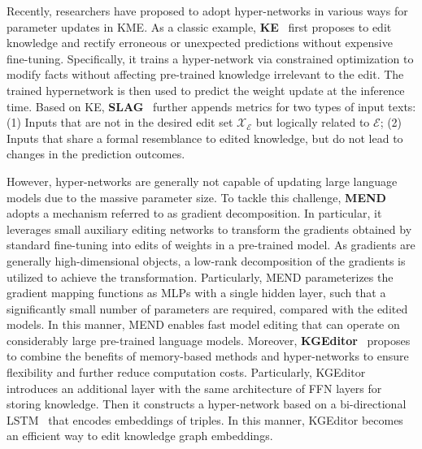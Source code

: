 \documentclass[acmsmall, screen]{acmart}
\begin{document}
Recently, researchers have proposed to adopt hyper-networks in various ways for parameter updates in KME. As a classic example, \textbf{KE}~\cite{cao2021editing} first proposes to edit knowledge and rectify erroneous or unexpected predictions without expensive fine-tuning. Specifically, it trains a hyper-network via constrained optimization to modify facts without affecting pre-trained knowledge irrelevant to the edit. The trained hypernetwork is then used to predict the weight update at the inference time. Based on KE, \textbf{SLAG}~\cite{hase2023methods} further appends metrics for two types of input texts: ({1)} Inputs that are not in the desired edit set $\mathcal{X}_\mathcal{E}$ but logically related to $\mathcal{E}$; (2) Inputs that share a formal resemblance to edited knowledge, but do not lead to changes in the prediction outcomes. 

However, hyper-networks are generally not capable of updating large language models due to the massive parameter size. To tackle this challenge, \textbf{MEND}~\cite{mitchell2022fast} adopts a mechanism referred to as gradient decomposition. In particular, it leverages small auxiliary editing networks to transform the gradients obtained by standard fine-tuning into edits of weights in a pre-trained model. As gradients are generally high-dimensional objects, a low-rank decomposition of the gradients is utilized to achieve the transformation. Particularly, MEND parameterizes the gradient mapping functions as MLPs with a single hidden layer, such that a significantly small number of parameters are required, compared with the edited models. In this manner, MEND enables fast model editing that can operate on considerably large pre-trained language models.
Moreover, \textbf{KGEditor}~\cite{cheng2023editing} proposes to combine the benefits of memory-based methods and hyper-networks to ensure flexibility and further reduce computation costs. Particularly, KGEditor introduces an additional layer with the same architecture of FFN layers for storing knowledge. Then it constructs a hyper-network based on a bi-directional LSTM~\cite{hochreiter1997long} that encodes embeddings of triples. In this manner, KGEditor becomes an efficient way to edit knowledge graph embeddings.
\end{document}
